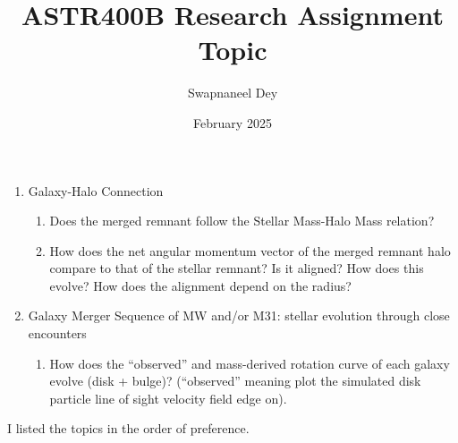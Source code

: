 \documentclass[12pt]{article}
\title{ASTR400B Research Assignment Topic}
\author{Swapnaneel Dey}
\date{February 2025}
\begin{document}
\maketitle
\begin{enumerate}
    \item Galaxy-Halo Connection
        \begin{enumerate}
            \item  Does the merged remnant follow the Stellar Mass-Halo Mass relation?

            \item How does the net angular momentum vector of the merged remnant halo compare to that of the stellar remnant? Is it aligned? How does this evolve? How does the alignment depend on the radius?
        \end{enumerate}
    \item Galaxy Merger Sequence of MW and/or M31: stellar evolution through close encounters
        \begin{enumerate}
            \item How does the “observed” and mass-derived rotation curve of each galaxy evolve (disk + bulge)? (“observed” meaning plot the simulated disk particle line of sight velocity field edge on).
        \end{enumerate}
\end{enumerate}

I listed the topics in the order of preference.
\end{document}
